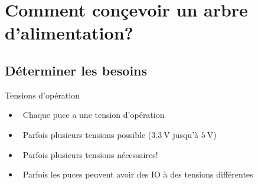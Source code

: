 
\section{Comment conçevoir un arbre d'alimentation?}

\subsection{Déterminer les besoins}

\begin{frame}{Tensions d'opération}
    \begin{itemize}
        \item[] \textcolor{UDSgreenFierte}{\faToggleOn} ~Chaque puce a une tension d'opération
        \item[] \textcolor{UDSgreenFierte}{\faList} ~Parfois plusieurs tensions possible ($\SI{3.3}{\volt}$ jusqu'à $\SI{5}{\volt}$)
        \item[] \textcolor{UDSgreenFierte}{\faSignal} ~Parfois plusieurs tensions nécessaires!
        \bigskip
        \item[] \textcolor{UDSgreenFierte}{\faWaveSquare} ~Parfois les puces peuvent avoir des IO à des tensions différentes
    \end{itemize}
\end{frame}


